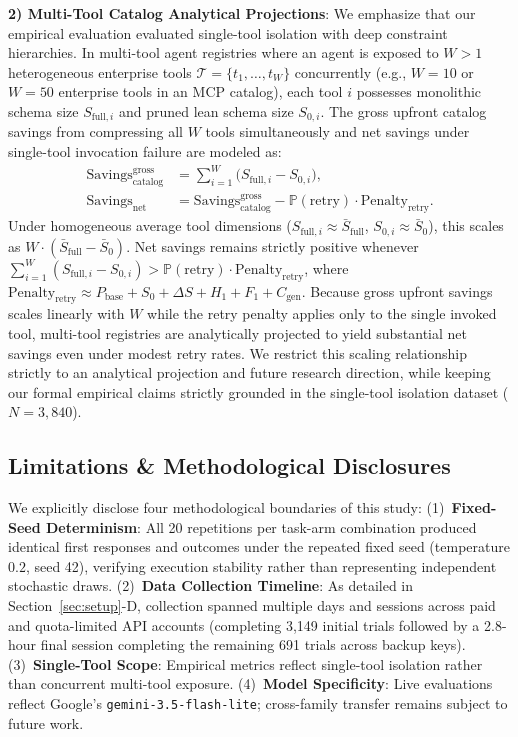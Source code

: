 \noindent\textbf{2) Multi-Tool Catalog Analytical Projections}: We emphasize that our empirical evaluation evaluated single-tool isolation with deep constraint hierarchies. In multi-tool agent registries where an agent is exposed to $W > 1$ heterogeneous enterprise tools $\mathcal{T} = \{t_1, \dots, t_W\}$ concurrently (e.g., $W = 10$ or $W = 50$ enterprise tools in an MCP catalog), each tool $i$ possesses monolithic schema size $S_{\text{full},i}$ and pruned lean schema size $S_{0,i}$. The gross upfront catalog savings from compressing all $W$ tools simultaneously and net savings under single-tool invocation failure are modeled as:
\begin{align}
\label{eq:multitool_savings}
\text{Savings}_{\text{catalog}}^{\text{gross}} &= \sum\nolimits_{i=1}^W \bigl( S_{\text{full},i} - S_{0,i} \bigr), \\
\label{eq:multitool_net}
\text{Savings}_{\text{net}} &= \text{Savings}_{\text{catalog}}^{\text{gross}} - \mathbb{P}(\text{retry}) \cdot \text{Penalty}_{\text{retry}}.
\end{align}
Under homogeneous average tool dimensions ($S_{\text{full},i} \approx \bar{S}_{\text{full}}$, $S_{0,i} \approx \bar{S}_0$), this scales as $W \cdot (\bar{S}_{\text{full}} - \bar{S}_0)$. Net savings remains strictly positive whenever $\sum_{i=1}^W (S_{\text{full},i} - S_{0,i}) > \mathbb{P}(\text{retry}) \cdot \text{Penalty}_{\text{retry}}$, where $\text{Penalty}_{\text{retry}} \approx P_{\text{base}} + S_0 + \Delta S + H_1 + F_1 + C_{\text{gen}}$. Because gross upfront savings scales linearly with $W$ while the retry penalty applies only to the single invoked tool, multi-tool registries are analytically projected to yield substantial net savings even under modest retry rates. We restrict this scaling relationship strictly to an analytical projection and future research direction, while keeping our formal empirical claims strictly grounded in the single-tool isolation dataset ($N=3,840$).

\subsection{Limitations \& Methodological Disclosures}
We explicitly disclose four methodological boundaries of this study: (1)~\textbf{Fixed-Seed Determinism}: All 20 repetitions per task-arm combination produced identical first responses and outcomes under the repeated fixed seed (temperature $0.2$, seed 42), verifying execution stability rather than representing independent stochastic draws. (2)~\textbf{Data Collection Timeline}: As detailed in Section~\ref{sec:setup}-D, collection spanned multiple days and sessions across paid and quota-limited API accounts (completing 3,149 initial trials followed by a 2.8-hour final session completing the remaining 691 trials across backup keys). (3)~\textbf{Single-Tool Scope}: Empirical metrics reflect single-tool isolation rather than concurrent multi-tool exposure. (4)~\textbf{Model Specificity}: Live evaluations reflect Google's \texttt{gemini-3.5-flash-lite}; cross-family transfer remains subject to future work.


